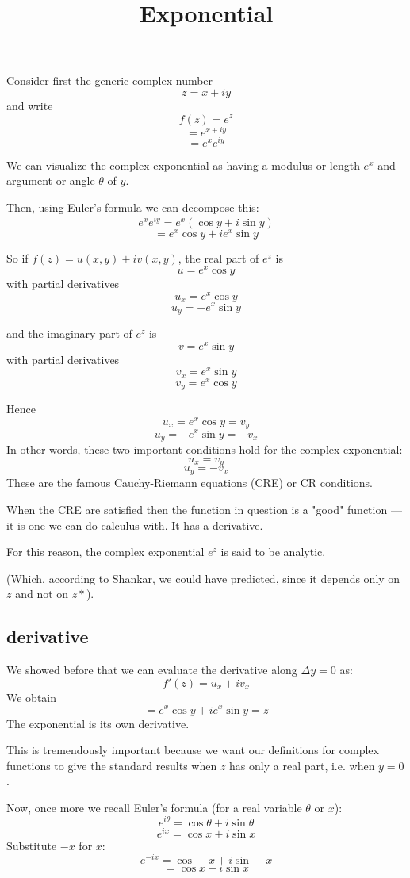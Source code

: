 \documentclass[11pt, oneside]{article}
\title{Exponential}
\date{}
\begin{document}
\maketitle
\Large


Consider first the generic complex number
\[ z = x + iy \]
and write
\[ f(z) = e^z \]
\[ = e^{x + iy} \]
\[ = e^x e^{iy} \]

We can visualize the complex exponential as having a modulus or length $e^x$ and argument or angle $\theta$ of $y$.

Then, using Euler's formula we can decompose this:
\[ e^x e^{iy} = e^x (\cos y + i \sin y) \]
\[ = e^x \cos y + i e^x \sin y \]

So if $f(z) = u(x,y) + i v(x,y)$, the real part of $e^z$ is 
\[ u = e^x \cos y \]
with partial derivatives
\[ u_x = e^x \cos y \]
\[ u_y = - e^x \sin y \]

and the imaginary part of $e^z$ is 
\[ v = e^x \sin y \]
with partial derivatives
\[ v_x = e^x \sin y \]
\[ v_y = e^x \cos y \]

Hence
\[ u_x = e^x \cos y = v_y \]
\[ u_y = - e^x \sin y = - v_x \]
In other words, these two important conditions hold for the complex exponential:
\[ u_x = v_y \]
\[ u_y = - v_x \]
These are the famous Cauchy-Riemann equations (CRE) or CR conditions.  

When the CRE are satisfied then the function in question is a "good" function --- it is one we can do calculus with.  It has a derivative.

For this reason, the complex exponential $e^z$ is said to be analytic. 

(Which, according to Shankar, we could have predicted, since it depends only on $z$ and not on $z*$).

\subsection*{derivative}

We showed before that we can evaluate the derivative along $\Delta y =0$ as:
\[ f'(z) = u_x + iv_x  \]
We obtain
\[ = e^x \cos y + i e^x \sin y = z \]
The exponential is its own derivative.

This is tremendously important because we want our definitions for complex functions to give the standard results when $z$ has only a real part, i.e. when $y=0$.

Now, once more we recall Euler's formula (for a real variable $\theta$ or $x$):
\[ e^{i \theta} = \cos \theta + i \sin \theta \]
\[ e^{i x} = \cos x + i \sin x \]
Substitute $-x$ for $x$:
\[ e^{-i x} = \cos -x + i \sin -x \]
\[ = \cos x - i \sin x \]
\end{document}
